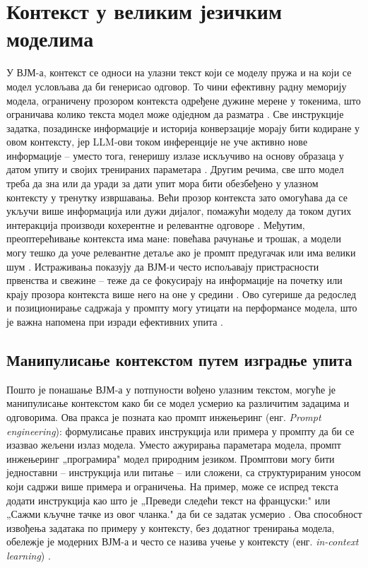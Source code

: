 \section{Контекст у великим језичким моделима}
\label{sec:llm_context}

У ВЈМ-а, контекст се односи на улазни текст који се моделу пружа и на који се модел условљава да би генерисао одговор. То чини ефективну радну меморију модела, ограничену прозором контекста одређене дужине мерене у токенима, што ограничава колико текста модел може одједном да разматра \cite{martineau_whats_2024}. Све инструкције задатка, позадинске информације и историја конверзације морају бити кодиране у овом контексту, јер LLM-ови током инференције не уче активно нове информације – уместо тога, генеришу излазе искључиво на основу образаца у датом упиту и својих тренираних параметара \cite{martineau_whats_2024}. Другим речима, све што модел треба да зна или да уради за дати упит мора бити обезбеђено у улазном контексту у тренутку извршавања. Већи прозор контекста зато омогућава да се укључи више информација или дужи дијалог, помажући моделу да током дугих интеракција производи кохерентне и релевантне одговоре \cite{martineau_whats_2024}. Међутим, преоптерећивање контекста има мане: повећава рачунање и трошак, а модели могу тешко да уоче релевантне детаље ако је промпт предугачак или има велики шум \cite{liu_lost_2023}. Истраживања показују да ВЈМ-и често испољавају пристрасности првенства и свежине – теже да се фокусирају на информације на почетку или крају прозора контекста више него на оне у средини \cite{liu_lost_2023}. Ово сугерише да редослед и позиционирање садржаја у промпту могу утицати на перформансе модела, што је важна напомена при изради ефективних упита \cite{liu_lost_2023}.

\subsection{Манипулисање контекстом путем изградње упита}

Пошто је понашање ВЈМ-а у потпуности вођено улазним текстом, могуће је манипулисање контекстом како би се модел усмерио ка различитим задацима и одговорима. Ова пракса је позната као промпт инжењеринг (енг. \textit{Prompt engineering}): формулисање правих инструкција или примера у промпту да би се изазвао жељени излаз модела. Уместо ажурирања параметара модела, промпт инжењеринг „програмира" модел природним језиком. Промптови могу бити једноставни – инструкција или питање – или сложени, са структурираним уносом који садржи више примера и ограничења. На пример, може се испред текста додати инструкција као што је „Преведи следећи текст на француски:" или „Сажми кључне тачке из овог чланка." да би се задатак усмерио \cite{sahoo_systematic_2025}. Ова способност извођења задатака по примеру у контексту, без додатног тренирања модела, обележје је модерних ВЈМ-а и често се назива учење у контексту (енг. \textit{in-context learning}) \cite{sahoo_systematic_2025}.

